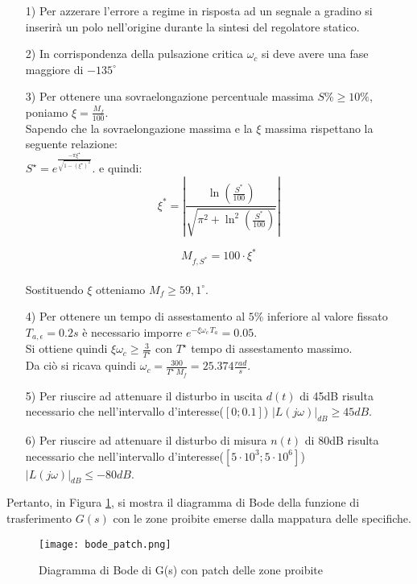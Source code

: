 \documentclass[a4paper, 11pt]{article}
\begin{document}
\begin{itemize}
	\item[1)] Per azzerare l'errore a regime in risposta ad un segnale a gradino si inserirà un polo nell'origine durante la sintesi del regolatore statico.\
	\item[2)] In corrispondenza della pulsazione critica $\omega_c$ si deve avere una fase maggiore di $-135^{\circ}$\
	\item[3)] Per ottenere una sovraelongazione percentuale massima $S\%\ge10\%$, poniamo $\xi=\frac{M_f}{100}$.
	\\
	Sapendo che la sovraelongazione massima e la $\xi$ massima rispettano la seguente relazione:\\
	 $S^\star=e^\frac{-\pi\xi^\star}{\sqrt{1-(\xi^\star)^2}}$. e quindi: \\
     \[
        \xi^* = \left| \frac{\ln{\left(\frac{S^*}{100}\right)}}{\sqrt{\pi^2 + \ln^2{\left(\frac{S^*}{100}\right)}}} \right|
        \]
        
        \[
        M_{f,S^*} = 100 \cdot \xi^*
        \]
	 \\
	 Sostituendo $\xi$ otteniamo $M_f\ge59,1^{\circ}$.
	\item[4)] Per ottenere un tempo di assestamento al $5\%$ inferiore al valore fissato  $T_{a,\epsilon}=0.2s$ è necessario imporre $e^{-\xi\omega_c\,T_a}=0.05$.\\
	Si ottiene quindi $\xi\omega_c\ge\frac{3}{T^\star}$ con $T^\star$ tempo di assestamento massimo.\\
	Da ciò si ricava quindi $\omega_c=\frac{300}{T^\star\,M_f}=25.374\frac{rad}{s}$.
	\item[5)] Per riuscire ad attenuare il disturbo in uscita $d(t)$ di 45dB risulta necessario che nell'intervallo d'interesse($[0;0.1]$) $|L(j\omega)|_{dB}\ge45dB$.\
	\item[6)] Per riuscire ad attenuare il disturbo di misura $n(t)$ di 80dB risulta necessario che nell'intervallo d'interesse($[5\cdot10^3;5\cdot10^6]$) $|L(j\omega)|_{dB}\le-80dB$.\
\end{itemize}
\clearpage
Pertanto, in Figura \ref{bodepatch}, si mostra il diagramma di Bode della funzione di trasferimento $G(s)$ con le zone proibite emerse dalla mappatura delle specifiche.

\begin{figure}[h!]
    \centering
    \texttt{[image: bode\_patch.png]}
    \caption{Diagramma di Bode di G(s) con patch delle zone proibite}
	\label{bodepatch}
\end{figure}
\end{document}
